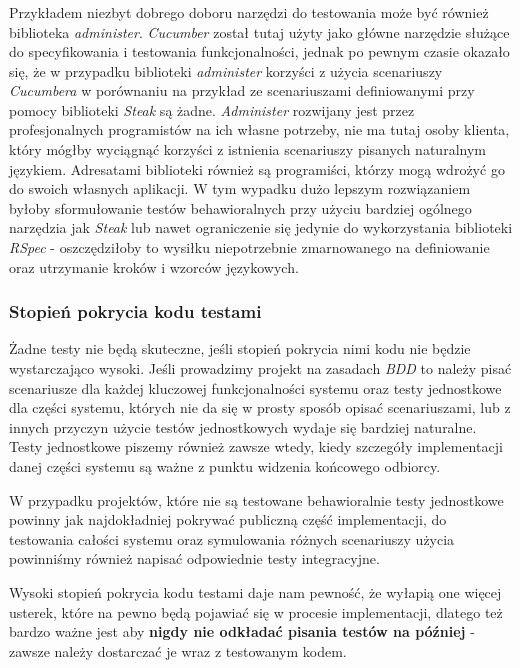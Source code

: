   \subsubsection{}
  Przykładem niezbyt dobrego doboru narzędzi do testowania może być również biblioteka \emph{administer}. \emph{Cucumber} został tutaj użyty jako główne narzędzie służące do specyfikowania i testowania funkcjonalności, jednak po pewnym czasie okazało się, że w przypadku biblioteki \emph{administer} korzyści z użycia scenariuszy \emph{Cucumbera} w porównaniu na przykład ze scenariuszami definiowanymi przy pomocy biblioteki \emph{Steak} są żadne. \emph{Administer} rozwijany jest przez profesjonalnych programistów na ich własne potrzeby, nie ma tutaj osoby klienta, który mógłby wyciągnąć korzyści z istnienia scenariuszy pisanych naturalnym językiem. Adresatami biblioteki również są programiści, którzy mogą wdrożyć go do swoich własnych aplikacji. W tym wypadku dużo lepszym rozwiązaniem byłoby sformułowanie testów behawioralnych przy użyciu bardziej ogólnego narzędzia jak \emph{Steak} lub nawet ograniczenie się jedynie do wykorzystania biblioteki \emph{RSpec} - oszczędziłoby to wysiłku niepotrzebnie zmarnowanego na definiowanie oraz utrzymanie kroków i wzorców językowych.
  
  \subsubsection{Stopień pokrycia kodu testami}
  Żadne testy nie będą skuteczne, jeśli stopień pokrycia nimi kodu nie będzie wystarczająco wysoki. Jeśli prowadzimy projekt na zasadach \emph{BDD} to należy pisać scenariusze dla każdej kluczowej funkcjonalności systemu oraz testy jednostkowe dla części systemu, których nie da się w prosty sposób opisać scenariuszami, lub z innych przyczyn użycie testów jednostkowych wydaje się bardziej naturalne. Testy jednostkowe piszemy również zawsze wtedy, kiedy szczegóły implementacji danej części systemu są ważne z punktu widzenia końcowego odbiorcy.
  
  W przypadku projektów, które nie są testowane behawioralnie testy jednostkowe powinny jak najdokładniej pokrywać publiczną część implementacji, do testowania całości systemu oraz symulowania różnych scenariuszy użycia powinniśmy również napisać odpowiednie testy integracyjne.
  
  Wysoki stopień pokrycia kodu testami daje nam pewność, że wyłapią one więcej usterek, które na pewno będą pojawiać się w procesie implementacji, dlatego też bardzo ważne jest aby \textbf{nigdy nie odkładać pisania testów na później} - zawsze należy dostarczać je wraz z testowanym kodem.
  
